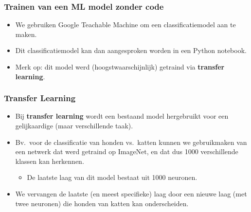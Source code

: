 \documentclass[aspectratio=169]{beamer}
\begin{document}
%
%






\begin{frame}
\frametitle{Trainen van een ML model zonder code}
\begin{itemize}
\item  We gebruiken Google Teachable Machine om een classificatiemodel aan te maken.
\item Dit classificatiemodel kan dan aangesproken worden in een Python notebook.
\item Merk op: dit model werd (hoogstwaarschijnlijk) getraind via \textbf{transfer learning}.
\end{itemize}
\end{frame}


\begin{frame}
\frametitle{Transfer Learning}
\begin{itemize}
\item Bij \textbf{transfer learning} wordt een bestaand model hergebruikt voor een gelijkaardige (maar verschillende taak).
\item Bv.\ voor de classificatie van honden vs.\ katten kunnen we gebruikmaken van een netwerk 
dat werd getraind op ImageNet, en dat dus 1000 verschillende  klassen kan herkennen.
\begin{itemize}
	\item De laatste laag van dit model bestaat uit 1000 neuronen.
\end{itemize}
\item We vervangen de laatste (en meest specifieke) laag door een nieuwe laag (met twee neuronen)
 die honden van katten kan onderscheiden.
\end{itemize}
\end{frame}
\end{document}
